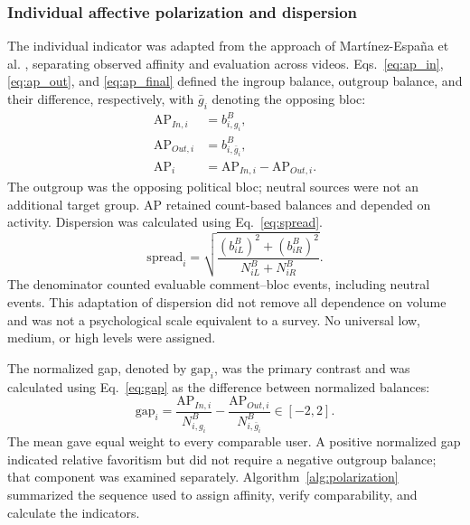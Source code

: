 \documentclass[conference,letterpaper]{IEEEtran}
\begin{document}
\subsubsection{Individual affective polarization and dispersion}
\label{subsubsec:ap_individual}
The individual indicator was adapted from the approach of Martínez-España et al. \cite{polariz}, separating observed affinity and evaluation across videos. Eqs.~\eqref{eq:ap_in}, \eqref{eq:ap_out}, and \eqref{eq:ap_final} defined the ingroup balance, outgroup balance, and their difference, respectively, with $\bar g_i$ denoting the opposing bloc:
\begin{align}
\mathrm{AP}_{In,i}&=b^B_{i,g_i},\label{eq:ap_in}\\
\mathrm{AP}_{Out,i}&=b^B_{i,\bar g_i},\label{eq:ap_out}\\
\mathrm{AP}_i&=\mathrm{AP}_{In,i}-\mathrm{AP}_{Out,i}.\label{eq:ap_final}
\end{align}
The outgroup was the opposing political bloc; neutral sources were not an additional target group. AP retained count-based balances and depended on activity. Dispersion was calculated using Eq.~\eqref{eq:spread}.
\begin{equation}
\mathrm{spread}_i=\sqrt{\frac{(b^B_{iL})^2+(b^B_{iR})^2}{N^B_{iL}+N^B_{iR}}}.
\label{eq:spread}
\end{equation}
The denominator counted evaluable comment--bloc events, including neutral events. This adaptation of dispersion \cite{wagner2021affective,polariz} did not remove all dependence on volume and was not a psychological scale equivalent to a survey. No universal low, medium, or high levels were assigned.

The normalized gap, denoted by $\mathrm{gap}_i$, was the primary contrast and was calculated using Eq.~\eqref{eq:gap} as the difference between normalized balances:
\begin{equation}
\mathrm{gap}_i=\frac{\mathrm{AP}_{In,i}}{N^B_{i,g_i}}-\frac{\mathrm{AP}_{Out,i}}{N^B_{i,\bar g_i}}\in[-2,2].
\label{eq:gap}
\end{equation}
The mean gave equal weight to every comparable user. A positive normalized gap indicated relative favoritism but did not require a negative outgroup balance; that component was examined separately. Algorithm~\ref{alg:polarization} summarized the sequence used to assign affinity, verify comparability, and calculate the indicators.
\end{document}

